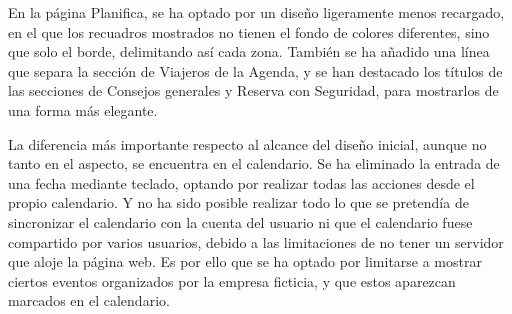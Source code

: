\documentclass[11pt, a4paper]{book}
\begin{document}
	En la página Planifica, se ha optado por un diseño ligeramente menos recargado, en el que los recuadros mostrados no tienen el fondo de colores diferentes, sino que solo el borde, delimitando así cada zona. También se ha añadido una línea que separa la sección de Viajeros de la Agenda, y se han destacado los títulos de las secciones de Consejos generales y Reserva con Seguridad, para mostrarlos de una forma más elegante.
	
	La diferencia más importante respecto al alcance del diseño inicial, aunque no tanto en el aspecto, se encuentra en el calendario. Se ha eliminado la entrada de una fecha mediante teclado, optando por realizar todas las acciones desde el propio calendario. Y no ha sido posible realizar todo lo que se pretendía de sincronizar el calendario con la cuenta del usuario ni que el calendario fuese compartido por varios usuarios, debido a las limitaciones de no tener un servidor que aloje la página web. Es por ello que se ha optado por limitarse a mostrar ciertos eventos organizados por la empresa ficticia, y que estos aparezcan marcados en el calendario.
	
\end{document}
